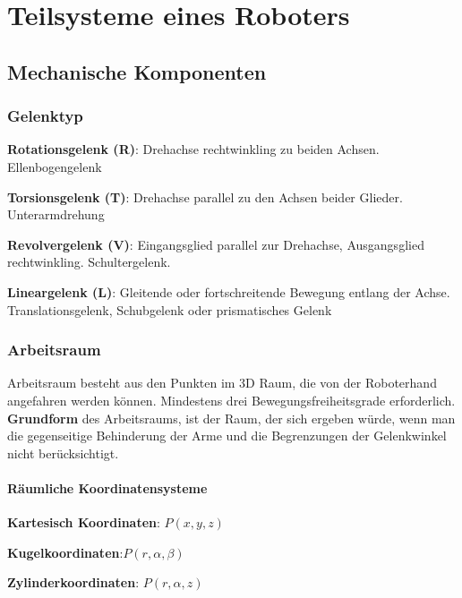 \chapter{Teilsysteme eines Roboters}

\section{Mechanische Komponenten}
\subsection{Gelenktyp}
\begin{compactitem}
    \item \textbf{Rotationsgelenk (R)}: Drehachse rechtwinkling zu beiden Achsen. Ellenbogengelenk
    \item \textbf{Torsionsgelenk (T)}: Drehachse parallel zu den Achsen beider Glieder. Unterarmdrehung
    \item \textbf{Revolvergelenk (V)}: Eingangsglied parallel zur Drehachse, Ausgangsglied rechtwinkling.
    Schultergelenk.
    \item \textbf{Lineargelenk (L)}: Gleitende oder fortschreitende Bewegung entlang der Achse.
    Translationsgelenk, Schubgelenk oder prismatisches Gelenk
\end{compactitem}
\subsection{Arbeitsraum}
Arbeitsraum besteht aus den Punkten im 3D Raum, die von der Roboterhand angefahren
werden können. Mindestens drei Bewegungsfreiheitsgrade erforderlich. \\
\textbf{Grundform} des Arbeitsraums, ist der Raum, der sich ergeben würde, wenn man die gegenseitige
Behinderung der Arme und die Begrenzungen der Gelenkwinkel nicht berücksichtigt.

\subsubsection{Räumliche Koordinatensysteme}
\begin{compactitem}
    \item \textbf{Kartesisch Koordinaten}: $P(x,y,z)$
    \item \textbf{Kugelkoordinaten}:$P(r,\alpha,\beta)$
    \item \textbf{Zylinderkoordinaten}: $P(r,\alpha,z)$
\end{compactitem}


